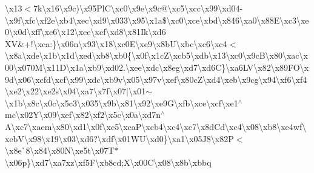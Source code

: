 \textbackslash{}x13$<$7k\textbackslash{}x16\textbackslash{}x9c)\textbackslash{}x95\+Pl\+C\textbackslash{}xc0\textbackslash{}x9e\textbackslash{}x9c@\textbackslash{}xc5\textbackslash{}xcc\textbackslash{}x99\textbackslash{}xd04-\/\textbackslash{}x9f\textbackslash{}xfc\textbackslash{}xf2e\textbackslash{}xb4\textbackslash{}xec\textbackslash{}xd9\textbackslash{}x033\textbackslash{}x95\textbackslash{}x1a\$\textbackslash{}xc0\textbackslash{}xce\textbackslash{}xbd\textbackslash{}x846\textbackslash{}xa0\textbackslash{}x88\+E\textbackslash{}xc3\textbackslash{}xe0\textbackslash{}x0d\textbackslash{}xff\textbackslash{}xc6\textbackslash{}x12\textbackslash{}xce\textbackslash{}xef\textbackslash{}xd8\textbackslash{}x81\+Ik\textbackslash{}xd6 X\+V\&+!\textbackslash{}xca\+:\}\textbackslash{}x06n\textbackslash{}x93\textbackslash{}x18\textbackslash{}xc0\+E\textbackslash{}xe9\textbackslash{}x8b\+U\textbackslash{}xbc\textbackslash{}xc6\textbackslash{}xc4$<$\textbackslash{}x8a\textbackslash{}xde\textbackslash{}x1b\textbackslash{}x1d\textbackslash{}xed\textbackslash{}xb8\textbackslash{}xb0\{\textbackslash{}x0f\textbackslash{}x1c\+Z\textbackslash{}xcb5\textbackslash{}xdb\textbackslash{}x13\textbackslash{}xc0\textbackslash{}x9c\+B\textbackslash{}x80\textbackslash{}xac\textbackslash{}x00\textbackslash{}x070\+M\textbackslash{}x11\+D\textbackslash{}x1a\textbackslash{}xb9\textbackslash{}xd02.\textbackslash{}xee\textbackslash{}xdc\textbackslash{}x8eg\textbackslash{}xd7\textbackslash{}xd6\+C\}\textbackslash{}xa6\+L\+V\textbackslash{}x82\textbackslash{}x89\+F\+O\textbackslash{}x9d\textbackslash{}x06\textbackslash{}xcfd\textbackslash{}xcf\textbackslash{}x99\textbackslash{}xdc\textbackslash{}xb9v\textbackslash{}x05\textbackslash{}x97v\textbackslash{}xef\textbackslash{}x80c\+Z\textbackslash{}xd4\textbackslash{}xeb\textbackslash{}x9cg\textbackslash{}x94\textbackslash{}xf6\textbackslash{}xf4\textbackslash{}xe2\textbackslash{}x22\textbackslash{}xe2s\textbackslash{}x04\textbackslash{}xa7\textbackslash{}x7f\textbackslash{}x07$\vert$\textbackslash{}x01$\sim$\textbackslash{}x1b\textbackslash{}x8c\textbackslash{}x0c\textbackslash{}x5c3\textbackslash{}x035\textbackslash{}x9b\textbackslash{}x81\textbackslash{}x92\textbackslash{}xe9\+G\textbackslash{}xfb\textbackslash{}xce\textbackslash{}xcf\textbackslash{}xe1$^\wedge$mc\textbackslash{}x02\+Y\textbackslash{}x09\textbackslash{}xef\textbackslash{}x82\textbackslash{}xf2\textbackslash{}x5c\textbackslash{}x0a\textbackslash{}xd7n$^\wedge$\+A\textbackslash{}xc7\textbackslash{}xaem\textbackslash{}x80\textbackslash{}xd1\textbackslash{}x0f\textbackslash{}xc5\textbackslash{}xca\+P\textbackslash{}xcb4\textbackslash{}xc4\textbackslash{}xc7\textbackslash{}x8d\+Cd\textbackslash{}xc4\textbackslash{}x08\textbackslash{}xb8\textbackslash{}xe4wf\textbackslash{}xeb\+V\textbackslash{}x98\textbackslash{}x19\textbackslash{}x03\textbackslash{}xd6?\textbackslash{}xdf\textbackslash{}x01\+W\+U\textbackslash{}xd0\}\textbackslash{}xa1\textbackslash{}x05\+J8\textbackslash{}x82\+P$<$\textbackslash{}x8e\`{}8\textbackslash{}x84\textbackslash{}x80\+N\textbackslash{}xe5t\textbackslash{}x07\+T$\ast$\textbackslash{}x06p\}\textbackslash{}xd7\textbackslash{}xa7xz\textbackslash{}xf5\+F\textbackslash{}xb8cd;\+X\textbackslash{}x00\+C\textbackslash{}x08\textbackslash{}x8b\textquotesingle{}\textbackslash{}xbbq\textbac